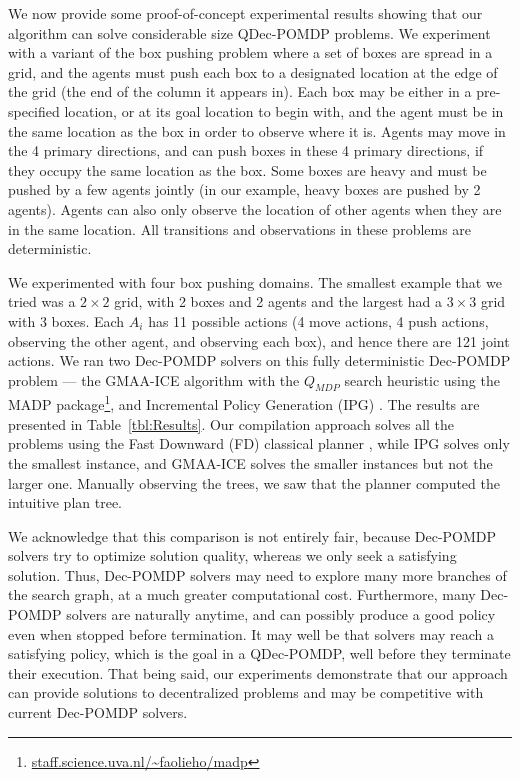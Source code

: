 \documentclass[letterpaper]{article}
\theoremstyle{definition}
\begin{document}
We now provide some proof-of-concept experimental results showing that our algorithm can solve considerable size QDec-POMDP problems. We experiment with a variant of the box pushing problem \cite{SZuai07} where a set of boxes are spread in a grid, and the agents must push each box to a designated location at the edge of the grid (the end of the column it appears in). Each box may be either in a pre-specified location, or at its goal location to begin with, and the agent must be in the same location as the box in order to observe where it is. Agents may move in the 4 primary directions, and can push boxes in these 4 primary directions, if they occupy the same location as the box. Some boxes are heavy and must be pushed by a few agents jointly (in our example, heavy boxes are pushed by 2 agents). Agents can also only observe the location of other agents when they are in the same location. All transitions and observations in these problems are deterministic.


We experimented with four box pushing domains. The smallest example that we tried was a $2 \times 2$ grid, with 2 boxes and 2 agents and the largest had a $3 \times 3$ grid with 3 boxes. Each $A_i$ has 11 possible actions (4 move actions, 4 push actions, observing the other agent, and observing each box), and hence there are 121 joint actions. We ran two Dec-POMDP solvers on this fully deterministic Dec-POMDP problem --- the GMAA-ICE algorithm with the $Q_{\mathit{MDP}}$ search heuristic \cite{Oliehoek} using the MADP package\footnote{\url{staff.science.uva.nl/~faolieho/madp}}, and Incremental Policy Generation (IPG) \cite{Amato}. The results are presented in Table~\ref{tbl:Results}. Our compilation approach solves all the problems using the Fast Downward (FD) classical planner \cite{Helmert}, while IPG solves only the smallest instance, and GMAA-ICE solves the smaller instances but not the larger one. Manually observing the trees, we saw that the planner computed the intuitive plan tree.

We acknowledge that this comparison is not entirely fair, because Dec-POMDP solvers try to optimize solution quality, whereas we only seek a satisfying solution. Thus, Dec-POMDP solvers may need to explore many more branches of the search graph, at a much greater computational cost. Furthermore, many Dec-POMDP solvers are naturally anytime, and can possibly produce a good policy even when stopped before termination. It may well be that solvers may reach a satisfying policy, which is the goal in a QDec-POMDP, well before they terminate their execution. That being said, our experiments demonstrate that our approach can provide solutions to decentralized problems and may be competitive with current Dec-POMDP solvers.
\end{document}
